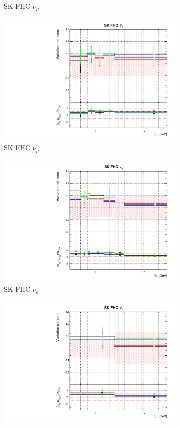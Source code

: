 \begin{figure}[t]
\begin{subfigure}{0.45\textwidth}
  \caption{SK FHC $\nu_{\mu}$}
\end{subfigure}
\begin{subfigure}{0.45\textwidth}
  \centering
  \includegraphics[width=0.75\linewidth]{figs/detcovbinflux_9}
  \caption{SK FHC $\bar{\nu_{\mu}}$}
\end{subfigure}
\begin{subfigure}{0.45\textwidth}
  \centering
  \includegraphics[width=0.75\linewidth]{figs/detcovbinflux_10}
  \caption{SK FHC $\nu_e$}
\end{subfigure}
\begin{subfigure}{0.45\textwidth}
  \centering
  \includegraphics[width=0.75\linewidth]{figs/detcovbinflux_11}

\end{subfigure}
\end{figure}
